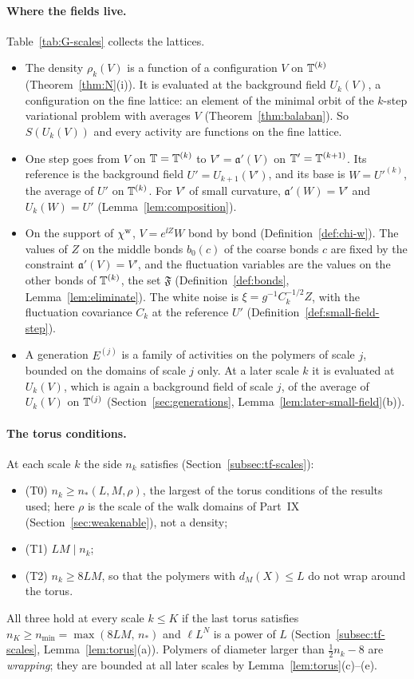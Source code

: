 \paragraph{Where the fields live.} Table~\ref{tab:G-scales} collects the lattices.
\begin{itemize}
\item The density $\rho_k(V)$ is a function of a configuration $V$ on $\mathbb T^{(k)}$ (Theorem~\ref{thm:N}(i)). It is evaluated at the background field $U_k(V)$, a configuration on the fine lattice: an element of the minimal orbit of the $k$-step variational problem with averages $V$ (Theorem~\ref{thm:balaban}). So $S(U_k(V))$ and every activity are functions on the fine lattice.
\item One step goes from $V$ on $\mathbb T=\mathbb T^{(k)}$ to $V'=\mathfrak a'(V)$ on $\mathbb T'=\mathbb T^{(k+1)}$. Its reference is the background field $U'=U_{k+1}(V')$, and its base is $W=U'^{(k)}$, the average of $U'$ on $\mathbb T^{(k)}$. For $V'$ of small curvature, $\mathfrak a'(W)=V'$ and $U_k(W)=U'$ (Lemma~\ref{lem:composition}).
\item On the support of $\chi^{\rm w}$, $V=e^{\ii Z}W$ bond by bond (Definition~\ref{def:chi-w}). The values of $Z$ on the middle bonds $b_0(c)$ of the coarse bonds $c$ are fixed by the constraint $\mathfrak a'(V)=V'$, and the fluctuation variables are the values on the other bonds of $\mathbb T^{(k)}$, the set $\mathfrak F$ (Definition~\ref{def:bonds}, Lemma~\ref{lem:eliminate}). The white noise is $\xi=g^{-1}C_k^{-1/2}Z$, with the fluctuation covariance $C_k$ at the reference $U'$ (Definition~\ref{def:small-field-step}).
\item A generation $E^{(j)}$ is a family of activities on the polymers of scale $j$, bounded on the domains of scale $j$ only. At a later scale $k$ it is evaluated at $U_k(V)$, which is again a background field of scale $j$, of the average of $U_k(V)$ on $\mathbb T^{(j)}$ (Section~\ref{sec:generations}, Lemma~\ref{lem:later-small-field}(b)).
\end{itemize}

\paragraph{The torus conditions.} At each scale $k$ the side $n_k$ satisfies (Section~\ref{subsec:tf-scales}):
\begin{itemize}
\item (T0) $n_k\ge n_*(L,M,\rho)$, the largest of the torus conditions of the results used; here $\rho$ is the scale of the walk domains of Part~IX (Section~\ref{sec:weakenable}), not a density;
\item (T1) $LM\mid n_k$;
\item (T2) $n_k\ge8LM$, so that the polymers with $d_M(X)\le L$ do not wrap around the torus.
\end{itemize}
All three hold at every scale $k\le K$ if the last torus satisfies $n_K\ge n_{\min}=\max(8LM,\,n_*)$ and $\ell L^N$ is a power of $L$ (Section~\ref{subsec:tf-scales}, Lemma~\ref{lem:torus}(a)). Polymers of diameter larger than $\frac12n_k-8$ are \emph{wrapping}; they are bounded at all later scales by Lemma~\ref{lem:torus}(c)--(e).

